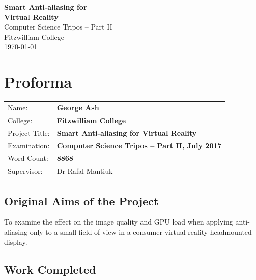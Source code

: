 \documentclass[12pt,a4paper,twoside,openright]{report}
\begin{document}





\pagestyle{empty}


\vspace*{60mm}
\begin{center}
\Huge
\textbf{Smart Anti-aliasing for\\ Virtual Reality} \\[5mm]
Computer Science Tripos -- Part II \\[5mm]
Fitzwilliam College \\[5mm]
\today  %
\end{center}


\pagestyle{plain}

\chapter*{Proforma}

{\large
\begin{tabular}{ll}
Name:               & \bf George Ash                       \\
College:            & \bf Fitzwilliam College                     \\
Project Title:      & \bf Smart Anti-aliasing for Virtual Reality \\
Examination:        & \bf Computer Science Tripos -- Part II, July 2017  \\
Word Count:         & \bf 8868 \\
Supervisor:         & Dr Rafal Mantiuk                    \\ 
\end{tabular}
}

\section*{Original Aims of the Project}

To examine the effect on the image quality and GPU load when applying anti-aliasing only to a small field of view in a consumer virtual reality headmounted display.

\section*{Work Completed}
\end{document}
